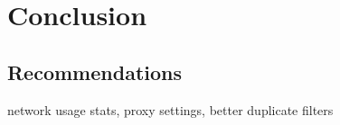 \chapter{Conclusion}
\section{Recommendations}
\noindent
network usage stats, proxy settings, better duplicate filters
